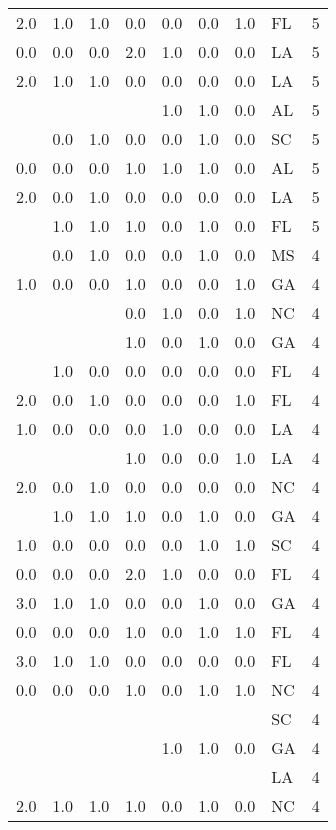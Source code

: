 \begin{tabular}{llllllllr}
2.0 & 1.0 & 1.0 & 0.0 & 0.0 & 0.0 & 1.0 & FL &     5 \\
0.0 & 0.0 & 0.0 & 2.0 & 1.0 & 0.0 & 0.0 & LA &     5 \\
2.0 & 1.0 & 1.0 & 0.0 & 0.0 & 0.0 & 0.0 & LA &     5 \\
    &     &     &     & 1.0 & 1.0 & 0.0 & AL &     5 \\
    & 0.0 & 1.0 & 0.0 & 0.0 & 1.0 & 0.0 & SC &     5 \\
0.0 & 0.0 & 0.0 & 1.0 & 1.0 & 1.0 & 0.0 & AL &     5 \\
2.0 & 0.0 & 1.0 & 0.0 & 0.0 & 0.0 & 0.0 & LA &     5 \\
    & 1.0 & 1.0 & 1.0 & 0.0 & 1.0 & 0.0 & FL &     5 \\
    & 0.0 & 1.0 & 0.0 & 0.0 & 1.0 & 0.0 & MS &     4 \\
1.0 & 0.0 & 0.0 & 1.0 & 0.0 & 0.0 & 1.0 & GA &     4 \\
    &     &     & 0.0 & 1.0 & 0.0 & 1.0 & NC &     4 \\
    &     &     & 1.0 & 0.0 & 1.0 & 0.0 & GA &     4 \\
    & 1.0 & 0.0 & 0.0 & 0.0 & 0.0 & 0.0 & FL &     4 \\
2.0 & 0.0 & 1.0 & 0.0 & 0.0 & 0.0 & 1.0 & FL &     4 \\
1.0 & 0.0 & 0.0 & 0.0 & 1.0 & 0.0 & 0.0 & LA &     4 \\
    &     &     & 1.0 & 0.0 & 0.0 & 1.0 & LA &     4 \\
2.0 & 0.0 & 1.0 & 0.0 & 0.0 & 0.0 & 0.0 & NC &     4 \\
    & 1.0 & 1.0 & 1.0 & 0.0 & 1.0 & 0.0 & GA &     4 \\
1.0 & 0.0 & 0.0 & 0.0 & 0.0 & 1.0 & 1.0 & SC &     4 \\
0.0 & 0.0 & 0.0 & 2.0 & 1.0 & 0.0 & 0.0 & FL &     4 \\
3.0 & 1.0 & 1.0 & 0.0 & 0.0 & 1.0 & 0.0 & GA &     4 \\
0.0 & 0.0 & 0.0 & 1.0 & 0.0 & 1.0 & 1.0 & FL &     4 \\
3.0 & 1.0 & 1.0 & 0.0 & 0.0 & 0.0 & 0.0 & FL &     4 \\
0.0 & 0.0 & 0.0 & 1.0 & 0.0 & 1.0 & 1.0 & NC &     4 \\
    &     &     &     &     &     &     & SC &     4 \\
    &     &     &     & 1.0 & 1.0 & 0.0 & GA &     4 \\
    &     &     &     &     &     &     & LA &     4 \\
2.0 & 1.0 & 1.0 & 1.0 & 0.0 & 1.0 & 0.0 & NC &     4 \\

\end{tabular}
